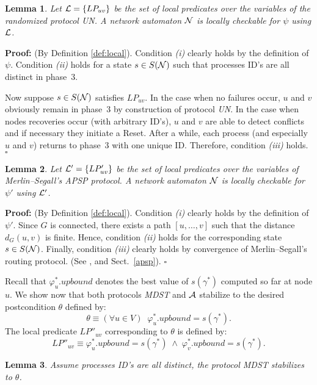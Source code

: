 \documentclass[10pt]{article}
\newtheorem{lemm}{Lemma}[section]
\newenvironment{proof}{\begin{trivlist}
                       \item[]\hspace{0cm}\textbf{Proof: }
                       \hspace{0cm} }{\hfill $\square$
                       \end{trivlist}}
\begin{document}
\begin{lemm}\label{lem:l}
Let ${\cal L}=\{LP_{uv}\}$ be the set of local predicates over the
variables of the randomized protocol UN. A network automaton $\cal N$
is locally checkable for $\psi$ using $\cal L$.
\end{lemm}

\begin{proof}
(By Definition \ref{def:local}).
Condition {\em (i)} clearly holds by the definition of $\psi$.
Condition {\em (ii)} holds for a state $s\in S({\cal N})$ such that
processes ID's are all distinct in phase~3.

Now suppose $s\in S({\cal N})$ satisfies $LP_{uv}$. In the case when
no failures occur, $u$ and $v$ obviously remain in phase~3 by construction
of protocol {\em UN}. In the case when nodes recoveries occur (with
arbitrary ID's), $u$ and $v$ are able to detect conflicts and if
necessary they initiate a Reset. After a while, each process (and
especially $u$ and $v$) returns to phase~3 with one unique ID.
Therefore, condition {\em (iii)} holds.
\end{proof}

\begin{lemm}\label{lem:l'}
Let ${\cal L'}=\{LP'_{uv}\}$ be the set of local predicates over the variables
of Merlin--Segall's APSP protocol.
A network automaton $\cal N$ is locally checkable for $\psi'$ using $\cal L'$.
\end{lemm}

\begin{proof}
(By Definition \ref{def:local}).
Condition {\em (i)} clearly holds by the definition of $\psi'$.
Since $G$ is connected, there exists a path $[u,\ldots ,v]$ such that the
distance $d_G(u,v)$ is finite. Hence, condition {\em (ii)} holds
for the corresponding state $s\in S({\cal N})$.
Finally, condition {\em (iii)} clearly holds by convergence
of Merlin--Segall's routing protocol. (See \cite[Property~(c)]{MeSe79}, and
Sect.~\ref{apsp}).
\end{proof}
Recall that $\varphi_u^*.upbound$ denotes the best value of $s(\gamma^*)$
computed so far at node $u$. We show now that both protocols {\em MDST} and $\cal A$ stabilize to the
desired postcondition $\theta$ defined by:
$$\theta \equiv (\forall u \in V) \;\; \varphi_u^*.upbound=s(\gamma^*).$$
The local predicate $LP''_{uv}$ corresponding to $\theta$ is defined by:
$$LP''_{uv}\equiv \varphi_u^*.upbound =s(\gamma^*)
\;\land\;\varphi_v^*.upbound =s(\gamma^*).$$

\begin{lemm}\label{lem:mdst-stab}
Assume processes ID's are all distinct, the protocol MDST stabilizes to
$\theta$.
\end{lemm}
\end{document}
